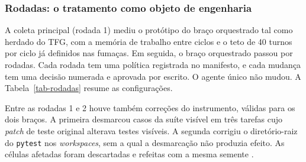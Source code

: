 \subsubsection{Rodadas: o tratamento como objeto de engenharia}

A coleta principal (rodada 1) mediu o protótipo do braço orquestrado tal como herdado do TFG, com a memória de trabalho entre ciclos e o teto de 40 turnos por ciclo já definidos nas fumaças. Em seguida, o braço orquestrado passou por rodadas. Cada rodada tem uma política registrada no manifesto, e cada mudança tem uma decisão numerada e aprovada por escrito. O agente único não mudou.  A Tabela~\ref{tab-rodadas} resume as configurações.

Entre as rodadas 1 e 2 houve também correções do instrumento, válidas para os dois braços. A primeira desmarcou casos da suíte visível em três tarefas cujo \textit{patch} de teste original alterava testes visíveis. A segunda corrigiu o diretório-raiz do \texttt{pytest} nos \textit{workspaces}, sem a qual a desmarcação não produzia efeito. As células afetadas foram descartadas e refeitas com a mesma semente .

